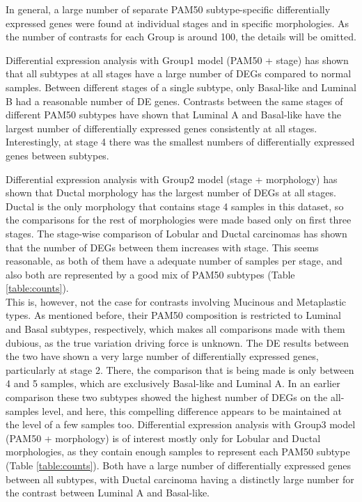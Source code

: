         In general, a large number of separate PAM50 subtype-specific differentially expressed genes were found at individual stages and in specific morphologies. As the number of contrasts for each Group is around 100, the details will be omitted. 
        
        Differential expression analysis with Group1 model (PAM50 + stage) has shown that all subtypes at all stages have a large number of DEGs compared to normal samples. Between different stages of a single subtype, only Basal-like and Luminal B had a reasonable number of DE genes. Contrasts between the same stages of different PAM50 subtypes have shown that Luminal A and Basal-like have the largest number of differentially expressed genes consistently at all stages. Interestingly, at stage 4 there was the smallest numbers of differentially expressed genes between subtypes. 
        
        Differential expression analysis with Group2 model (stage + morphology) has shown that Ductal morphology has the largest number of DEGs at all stages. Ductal is the only morphology that contains stage 4 samples in this dataset, so the comparisons for the rest of morphologies were made based only on first three stages. The stage-wise comparison of Lobular and Ductal carcinomas has shown that the number of DEGs between them increases with stage. This seems reasonable, as both of them have a adequate number of samples per stage, and also both are represented by a good mix of PAM50 subtypes (Table \ref{table:counts}). \\ This is, however, not the case for contrasts involving Mucinous and Metaplastic types. As mentioned before, their PAM50 composition is restricted to Luminal and Basal subtypes, respectively, which makes all comparisons made with them dubious, as the true variation driving force is unknown. The DE results between the two have shown a very large number of differentially expressed genes, particularly at stage 2. There, the comparison that is being made is only between 4 and 5 samples, which are exclusively Basal-like and Luminal A. In an earlier comparison these two subtypes showed the highest number of DEGs on the all-samples level, and here, this compelling difference appears to be maintained at the level of a few samples too. 
        \newpage
        Differential expression analysis with Group3 model (PAM50 + morphology) is of interest mostly only for Lobular and Ductal morphologies, as they contain enough samples to represent each PAM50 subtype (Table \ref{table:counts}). Both have a large number of differentially expressed genes between all subtypes, with Ductal carcinoma having a distinctly large number for the contrast between Luminal A and Basal-like.  \\

